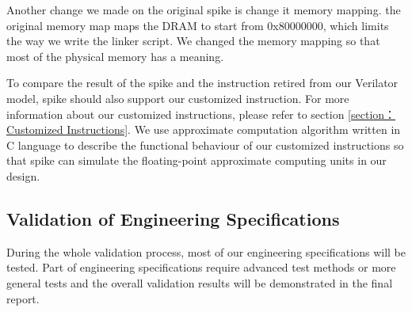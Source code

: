 Another change we made on the original spike is change it memory mapping. the original memory map maps the DRAM to start from 0x80000000, which limits the way we write the linker script. We changed the memory mapping so that most of the physical memory has a meaning.

To compare the result of the spike and the instruction retired from our Verilator model, spike should also support our customized instruction. For more information about our customized instructions, please refer to section \ref{section：Customized Instructions}. We use approximate computation algorithm written in C language to describe the functional behaviour of our customized instructions so that spike can simulate the floating-point approximate computing units in our design. 


\subsection{Validation of Engineering Specifications}
During the whole validation process, most of our engineering specifications will be tested. Part of engineering specifications require advanced test methods or more general tests and the overall validation results will be demonstrated in the final report.

